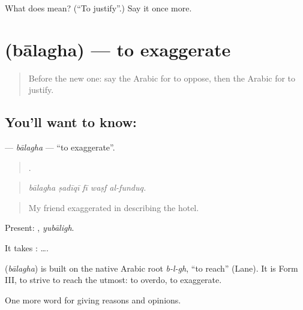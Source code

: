 \begin{tcolorbox}[breakable,colback=teal!4,colframe=teal!35!black,title={Before you move on}]
What does  mean? (\textquotedblleft{}To justify\textquotedblright{}.) Say it once more.
\end{tcolorbox}
\section[\texorpdfstring{\ar{بالغ} (bālagha)}{بالغ (bālagha)}]{ (bālagha) — to exaggerate}

\label{lesson:AR-C370-balagha}



\begin{quote}
Before the new one: say the Arabic for to oppose, then the Arabic for to justify.
\end{quote}

\subsection*{You'll want to know: }
\textbf{} — \emph{bālagha} — \textquotedblleft{}to exaggerate\textquotedblright{}.

\begin{quote}
    .
\end{quote}

\begin{quote}
\emph{bālagha ṣadīqī fī waṣf al-funduq.}
\end{quote}

\begin{quote}
My friend exaggerated in describing the hotel.
\end{quote}

Present: , \emph{yubāligh}.

It takes :   ….

\begin{cousinweb}
\textbf{} (\emph{bālagha}) is built on the native Arabic root \emph{b-l-gh}, \textquotedblleft{}to reach\textquotedblright{} (Lane). It is Form III, to strive to reach the utmost: to overdo, to exaggerate.
\end{cousinweb}

\begin{grammarlens}[title={What you've built}]
One more word for giving reasons and opinions.
\end{grammarlens}

